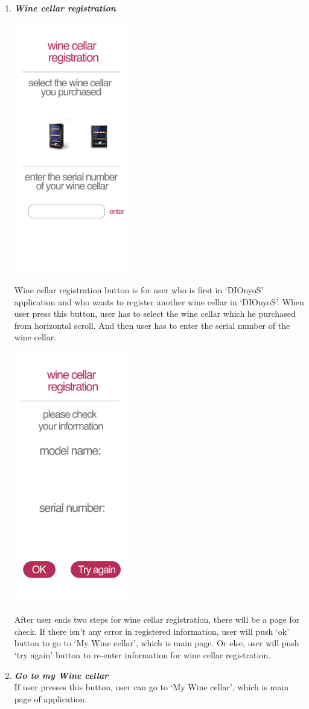 \documentclass[conference]{IEEEtran}
\numberwithin{figure}{subsection}
\begin{document}
\begin{enumerate}
\item \textit{\textbf{Wine cellar registration}}\\
\centerline{\includegraphics[width=5cm]{winecellarregi.png}}
Wine cellar registration button is for user who is first in ‘DIOnyoS’ application and who wants to register another wine cellar in ‘DIOnyoS’. When user press this button, user has to select the wine cellar which he purchased from horizontal scroll. And then user has to enter the serial number of the wine cellar.\\
\centerline{\includegraphics[width=5cm]{regicheck.png}}
After user ends two steps for wine cellar registration, there will be a page for check. If there isn’t any error in registered information, user will push ‘ok’ button to go to ‘My Wine cellar’, which is main page. Or else, user will push ‘try again’ button to re-enter information for wine cellar registration.
\item \textit{\textbf{Go to my Wine cellar}}\\
If user presses this button, user can go to ‘My Wine cellar’, which is main page of application.
\end{enumerate}
\end{document}
